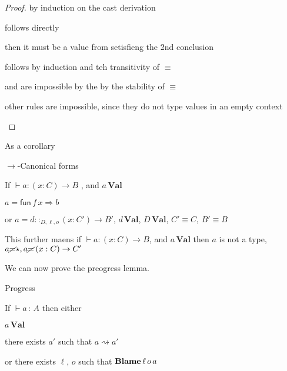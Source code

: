 \begin{proof}
by induction on the cast derivation

\begin{casenv}
  \item {} follows directly
  \item {} then it must be a value from  setisfieng the 2nd conclusion
  \item {} follows by induction and teh transitivity of $\equiv$

  \item {} and  are impossible by the by the stability of $\equiv$
  \item other rules are impossible, since they do not type values in an empty context
\end{casenv}
\end{proof}
As a corollary
\begin{cor}
$\rightarrow$-Canonical forms

If $\vdash a:\left(x:C\right)\rightarrow B$ , and $a\,\textbf{Val}$

$a=\mathsf{fun}\,f\,x\Rightarrow b$ 

or $a=d::_{D,\ell ,o}\left(x:C'\right)\rightarrow B'$, $d\,\textbf{Val}$, $D\,\textbf{Val}$, $C'\equiv C$, $B'\equiv B$ 
\end{cor}

This further maens if $\vdash a:\left(x:C\right)\rightarrow B$, and $a\,\textbf{Val}$ then $a$ is not a type, $a\cancel{=}\star,a\cancel{=}\left(x:C\right)\rightarrow C'$

We can now prove the preogress lemma.

\begin{thm}
Progress

If $\vdash a\,:\,A$ then either 

$a\,\textbf{Val}$

there exists $a'$ such that $a\rightsquigarrow a'$

or there exists $\ell$, $o$ such that $\textbf{Blame} \,\ell \,o\,a$
\end{thm}

